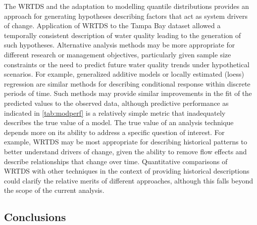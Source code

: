 \documentclass{svjour3}\usepackage[]{graphicx}\usepackage[]{color}
\begin{document}
The \ac{WRTDS} and the adaptation to modelling quantile distributions provides an approach for generating hypotheses describing factors that act as system drivers of change.  Application of \ac{WRTDS} to the Tampa Bay dataset allowed a temporally consistent description of water quality leading to the generation of such hypotheses.  Alternative analysis methods may be more appropriate for different research or management objectives, particularly given sample size constraints or the need to predict future water quality trends under hypothetical scenarios.  For example, generalized additive models or locally estimated (loess) regression are similar methods for describing conditional response within discrete periods of time.  Such methods may provide similar improvements in the fit of the predicted values to the observed data, although predictive performance as indicated in \cref{tab:modperf} is a relatively simple metric that inadequately describes the true value of a model. The true value of an analysis technique depends more on its ability to address a specific question of interest.  For example, \ac{WRTDS} may be most appropriate for describing historical patterns to better understand drivers of change, given the ability to remove flow effects and describe relationships that change over time.  Quantitative comparisons of \ac{WRTDS} with other techniques in the context of providing historical descriptions could clarify the relative merits of different approaches, although this falls beyond the scope of the current analysis.

\subsection{Conclusions}
\end{document}
